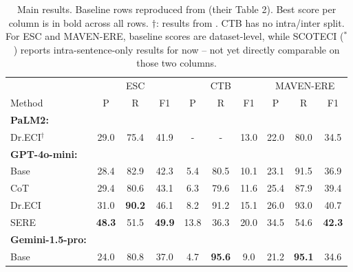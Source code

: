 \documentclass[11pt]{article}
\begin{document}
\begin{table}[htbp]
\centering
\small
\caption{Main results. Baseline rows reproduced from \citet{hao2026sere} (their Table 2). Best score per column is in bold across all rows. $\dagger$: results from \citet{cai2025dreci}. CTB has no intra/inter split. For ESC and MAVEN-ERE, baseline scores are dataset-level, while SCOTECI ($^*$) reports intra-sentence-only results for now -- not yet directly comparable on those two columns.}
\label{tab:main-results}
\begin{tabular}{l ccc|ccc|ccc}
\toprule
 & \multicolumn{3}{c|}{ESC} & \multicolumn{3}{c|}{CTB} & \multicolumn{3}{c}{MAVEN-ERE} \\
Method & P & R & F1 & P & R & F1 & P & R & F1 \\
\midrule
\textbf{PaLM2:} & & & & & & & & & \\
\quad Dr.ECI$^\dagger$ & 29.0 & 75.4 & 41.9 & - & - & 13.0 & 22.0 & 80.0 & 34.5 \\
\midrule
\textbf{GPT-4o-mini:} & & & & & & & & & \\
\quad Base          & 28.4 & 82.9 & 42.3 & 5.4  & 80.5 & 10.1 & 23.1 & 91.5 & 36.9 \\
\quad CoT           & 29.4 & 80.6 & 43.1 & 6.3  & 79.6 & 11.6 & 25.4 & 87.9 & 39.4 \\
\quad Dr.ECI        & 31.0 & \textbf{90.2} & 46.1 & 8.2  & 91.2 & 15.1 & 26.0 & 93.0 & 40.7 \\
\quad SERE          & \textbf{48.3} & 51.5 & \textbf{49.9} & 13.8 & 36.3 & 20.0 & 34.5 & 54.6 & \textbf{42.3} \\
\midrule
\textbf{Gemini-1.5-pro:} & & & & & & & & & \\
\quad Base          & 24.0 & 80.8 & 37.0 & 4.7  & \textbf{95.6} & 9.0  & 21.2 & \textbf{95.1} & 34.6 \\

\end{tabular}
\end{table}
\end{document}
